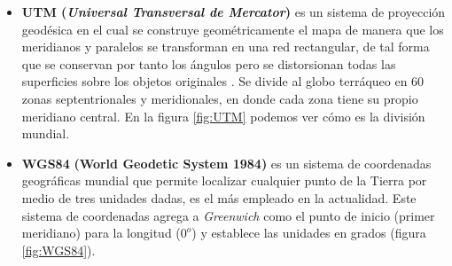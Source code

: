 \begin{itemize}
	\item \textbf{UTM (\textit{Universal Transversal de Mercator})} es un sistema de proyección geodésica en el cual se construye geométricamente el mapa de manera que los meridianos y paralelos se transforman en una red rectangular, de tal forma que se conservan por tanto los ángulos pero se distorsionan todas las superficies sobre los objetos originales \cite{utm-nuevo}. Se divide al globo terráqueo en 60 zonas septentrionales y meridionales, en donde cada zona tiene su propio meridiano central. En la figura \ref{fig:UTM} podemos ver cómo es la división mundial.
	
	\item \textbf{WGS84} \textbf{(World Geodetic System 1984)} es un sistema de coordenadas geográficas mundial que permite localizar cualquier punto de la Tierra por medio de tres unidades dadas, es el más empleado en la actualidad. Este sistema de coordenadas agrega a \textit{Greenwich} como el punto de inicio (primer meridiano) para la longitud ($0^o$) y establece las unidades en grados \cite{VictorOlaya} (figura \ref{fig:WGS84}).
\end{itemize}

